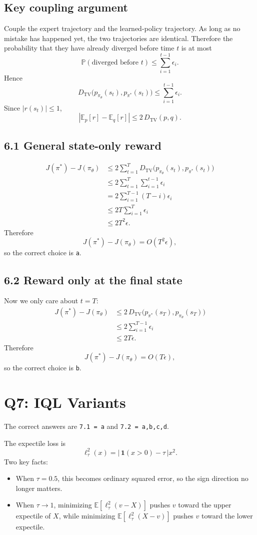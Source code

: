 \documentclass[11pt]{article}
\newcommand{\E}{\mathbb{E}}
\newcommand{\Prb}{\mathbb{P}}
\newcommand{\TV}{D_{\mathrm{TV}}}
\newcommand{\1}{\mathbf{1}}
\newcommand{\eps}{\epsilon}
\begin{document}
\subsection*{Key coupling argument}
Couple the expert trajectory and the learned-policy trajectory. As long as no mistake has happened yet, the two trajectories are identical. Therefore the probability that they have already diverged before time $t$ is at most
\[
\Prb(\text{diverged before }t)\le \sum_{i=1}^{t-1}\eps_i.
\]
Hence
\[
\TV\big(p_{\pi_\theta}(s_t),p_{\pi^*}(s_t)\big)
\le
\sum_{i=1}^{t-1}\eps_i.
\]
Since $|r(s_t)|\le 1$,
\[
\left|\E_p[r]-\E_q[r]\right|\le 2\,\TV(p,q).
\]

\subsection*{6.1 General state-only reward}
\[
\begin{aligned}
J(\pi^*)-J(\pi_\theta)
&\le
2\sum_{t=1}^T \TV\big(p_{\pi_\theta}(s_t),p_{\pi^*}(s_t)\big) \\
&\le
2\sum_{t=1}^T\sum_{i=1}^{t-1}\eps_i \\
&=
2\sum_{i=1}^{T-1}(T-i)\eps_i \\
&\le
2T\sum_{i=1}^T \eps_i \\
&\le
2T^2\eps.
\end{aligned}
\]
Therefore
\[
J(\pi^*)-J(\pi_\theta)=O(T^2\eps),
\]
so the correct choice is \texttt{a}.

\subsection*{6.2 Reward only at the final state}
Now we only care about $t=T$:
\[
\begin{aligned}
J(\pi^*)-J(\pi_\theta)
&\le
2\,\TV\big(p_{\pi^*}(s_T),p_{\pi_\theta}(s_T)\big) \\
&\le
2\sum_{i=1}^{T-1}\eps_i \\
&\le
2T\eps.
\end{aligned}
\]
Therefore
\[
J(\pi^*)-J(\pi_\theta)=O(T\eps),
\]
so the correct choice is \texttt{b}.

\section{Q7: IQL Variants}
The correct answers are \texttt{7.1 = a} and \texttt{7.2 = a,b,c,d}.

The expectile loss is
\[
\ell_\tau^2(x)=|\,\1(x>0)-\tau\,|x^2.
\]
Two key facts:
\begin{itemize}[leftmargin=2em]
\item When $\tau=0.5$, this becomes ordinary squared error, so the sign direction no longer matters.
\item When $\tau\to 1$, minimizing $\E[\ell_\tau^2(v-X)]$ pushes $v$ toward the upper expectile of $X$, while minimizing $\E[\ell_\tau^2(X-v)]$ pushes $v$ toward the lower expectile.
\end{itemize}
\end{document}
